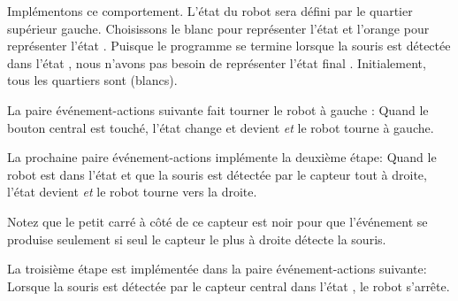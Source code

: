 Implémentons ce comportement.
L'état du robot sera défini par le quartier supérieur gauche.
Choisissons le blanc pour représenter l'état  et l'orange pour représenter l'état .
Puisque le programme se termine lorsque la souris est détectée dans l'état ,
nous n'avons pas besoin de représenter l'état final .
Initialement, tous les quartiers sont  (blancs).

La paire événement-actions suivante fait tourner le robot à gauche : 
Quand le bouton central est touché, l'état change et devient
 \emph{et} le robot tourne à gauche.


La prochaine paire événement-actions implémente la deuxième étape: 
Quand le robot est dans l'état  et
que la souris est détectée par le capteur tout à droite,
l'état devient 
\emph{et} le robot tourne vers la droite.

Notez que le petit carré à côté de ce capteur est noir pour que l'événement se produise seulement si seul le capteur le plus à droite détecte la souris.

La troisième étape est implémentée dans la paire événement-actions suivante: 
Lorsque la souris est détectée par le capteur central dans l'état , le robot s'arrête.




\bigskip

\bigskip


\bigskip

